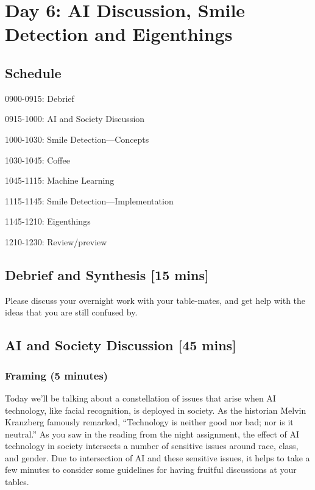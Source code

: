 \chapter{Day 6: AI Discussion, Smile Detection and Eigenthings}

\section{Schedule}
\bi
\item 0900-0915: Debrief
\item 0915-1000: AI and Society Discussion
\item 1000-1030: Smile Detection---Concepts
\item 1030-1045: Coffee
\item 1045-1115: Machine Learning
\item 1115-1145: Smile Detection---Implementation
\item 1145-1210: Eigenthings
\item 1210-1230: Review/preview
\ei

\section{Debrief and Synthesis [15 mins]}

\bi
\item Please discuss your overnight work with your table-mates, and get help with the ideas that you are still confused by.
\ei

\section{AI and Society Discussion [45 mins]}

\subsection{Framing (5 minutes)}

Today we'll be talking about a constellation of issues that arise when AI technology, like facial recognition, is deployed in society.  As the historian Melvin Kranzberg famously remarked, ``Technology is neither good nor bad; nor is it neutral.''  As you saw in the reading from the night assignment, the effect of AI technology in society intersects a number of sensitive issues around race, class, and gender.  Due to intersection of AI and these sensitive issues, it helps to take a few minutes to consider some guidelines for having fruitful discussions at your tables.

